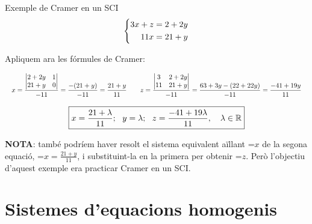 \documentclass[11pt,a4paper]{article}
\newcommand{\fmm}[1]{\setbox0=\hbox{$#1$}\ifdim\wd0>\linewidth\fmdisp{#1}\else\mbox{\box0}\fi}
\newcommand{\fmdisp}[1]{\[\setbox2=\hbox{$\displaystyle #1$}\ifdim\wd2>\linewidth\resizebox{\linewidth}{!}{\box2}\else\box2\fi\]}
\newcommand{\fmuline}[1]{\textbf{\color{fmaccent}#1}}
\begin{document}
\begin{fmex}{Exemple de Cramer en un SCI}
\fmdisp{\left\{\begin{aligned}3x+z&=2+2y\\ 11x&=21+y\end{aligned}\right.}

Apliquem ara les fórmules de Cramer:

\fmdisp{x=\frac{\begin{vmatrix}2+2y & 1\\ 21+y & 0\end{vmatrix}}{-11}=\frac{-(21+y)}{-11}=\frac{21+y}{11}\qquad z=\frac{\begin{vmatrix}3 & 2+2y\\ 11 & 21+y\end{vmatrix}}{-11}=\frac{63+3y-(22+22y)}{-11}=\frac{-41+19y}{11}}

\fmdisp{\boxed{x=\frac{21+\lambda}{11};\ \ y=\lambda;\ \ z=\frac{-41+19\lambda}{11},\quad\lambda\in\mathbb{R}}}

\vspace*{0.2cm}

\begin{fmnote}\fmuline{NOTA}: també podríem haver resolt el sistema equivalent aïllant \fmm{x} de la segona equació, \fmm{x=\frac{21+y}{11}}, i substituint-la en la primera per obtenir \fmm{z}. Però l'objectiu d'aquest exemple era practicar Cramer en un SCI.\end{fmnote}
\end{fmex}

\section{Sistemes d'equacions homogenis}\hypertarget{sec4}{}
\end{document}
